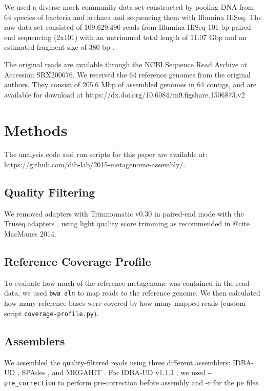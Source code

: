 \documentclass[10pt,a4paper,twocolumn]{article}
\begin{document}
We used a diverse mock community data set constructed by pooling DNA
from 64 species of bacteria and archaea and sequencing them with
Illumina HiSeq.  The raw data set consisted of 109,629,496 reads from
Illumina HiSeq 101 bp paired-end sequencing (2x101) with an untrimmed
total length of 11.07 Gbp and an estimated fragment size of 380 bp
\cite{podar}.
 
The original reads are available through the NCBI Sequence Read
Archive at Accession SRX200676.
We received the 64 reference genomes from the original authors. They
consist of 205.6 Mbp of assembled genomes in 64 contigs, and are
available for download at
https://dx.doi.org/10.6084/m9.figshare.1506873.v2

\section*{Methods}
The analysis code and run scripts for this paper are available at:
https://github.com/dib-lab/2015-metagenome-assembly/.

\subsection*{Quality Filtering} 

We removed adapters with Trimmomatic v0.30 in paired-end mode with the
Truseq adapters \cite{trimmomatic}, using light quality score trimming
as recommended in @cite MacManes 2014.


\subsection*{Reference Coverage Profile}

To evaluate how much of the reference metagenome was contained in the read
data, we used {\tt bwa aln} to map reads to the reference genome.  We then
calculated how many reference bases were covered by how many mapped
reads (custom script {\tt coverage-profile.py}).

\subsection*{Assemblers}
We assembled the quality-filtered reads using three different assemblers: IDBA-UD
\cite{idba}, SPAdes \cite{spades}, and MEGAHIT \cite{megahit}.  For
IDBA-UD v1.1.1 \cite{idba}, we used {\tt {--pre\_correction}} to
perform pre-correction before assembly and -r for the pe files.
\end{document}
